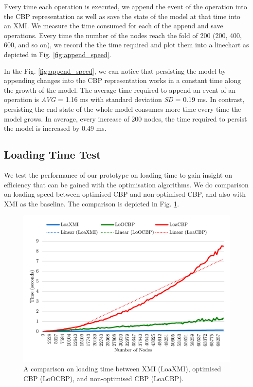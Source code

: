 \documentclass{llncs}
\begin{document}
Every time each operation is executed, we append the event of the operation into the CBP representation as well as save the state of the model at that time into an XMI. We measure the time consumed for each of the append and save operations. Every time the number of the nodes reach the fold of 200 (200, 400, 600, and so on), we record the the time required and plot them into a linechart as depicted in Fig. \ref{fig:append_speed}.

In the Fig. \ref{fig:append_speed}, we can notice that persisting the model by appending changes into the CBP representation works in a constant time along the growth of the model. The average time required to append an event of an operation is \emph{AVG} = 1.16 ms with standard deviation \emph{SD} = 0.19 ms. In contrast, persisting the end state of the whole model consumes more time every time the model grows. In average, every increase of 200 nodes, the time required to persist the model is increased by 0.49 ms. 

\subsection{Loading Time Test}
\label{subsec:loading_time_test}
We test the performance of our prototype on loading time to gain insight on efficiency that can be gained with the optimisation algorithms. We do comparison on loading speed between optimised CBP and non-optimised CBP, and also with XMI as the baseline. The  comparison is depicted in Fig. \ref{fig:loading_speed}.

\begin{figure}[ht]
\centering
\includegraphics[width=\linewidth]{loading_speed}
\caption{A comparison on loading time between XMI (LoaXMI), optimised CBP (LoOCBP), and non-optimised CBP (LoaCBP).}
\label{fig:loading_speed}
\end{figure}
\end{document}
